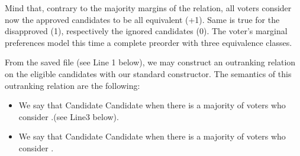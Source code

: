 \documentclass[a4paper,12pt,english]{sphinxhowto}
\begin{document}
\sphinxAtStartPar
Mind that, contrary to the majority margins of the  relation, all voters consider now the approved candidates to be all equivalent (+1). Same is true for the disapproved (\sphinxhyphen{}1), respectively the ignored candidates (0). The voter’s marginal preferences model this time a complete preorder with three equivalence classes.

\sphinxAtStartPar
From the saved file  (see Line 1 below), we may construct an outranking relation on the eligible candidates with our standard  constructor. The semantics of this outranking relation are the following:
\begin{itemize}
\item {} 
\sphinxAtStartPar
We say that Candidate   Candidate  when there is a majority of voters who consider   .(see Line3 below).

\item {} 
\sphinxAtStartPar
We say that Candidate   Candidate  when there is a majority of voters who consider   .

\end{itemize}
\end{document}
